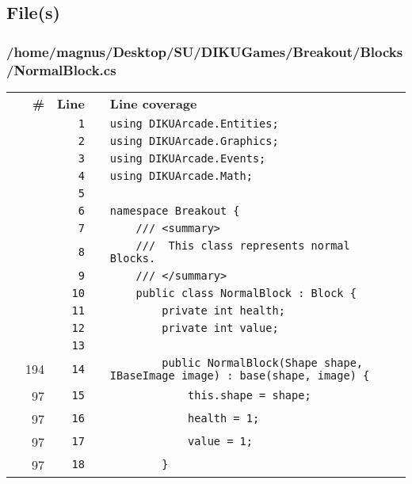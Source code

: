 \documentclass[a4paper,landscape,10pt]{article}
\begin{document}
\subsection{File(s)}
\subsubsection{/home/magnus/Desktop/SU/DIKUGames/Breakout/Blocks/NormalBlock.cs}
\begin{longtable}[l]{lrrll}
\textbf{} & \textbf{\#} & \textbf{Line} & \textbf{} & \textbf{Line coverage}\\
\cellcolor{gray} &  & \verb~1~ & & \verb~using DIKUArcade.Entities;~\\
\cellcolor{gray} &  & \verb~2~ & & \verb~using DIKUArcade.Graphics;~\\
\cellcolor{gray} &  & \verb~3~ & & \verb~using DIKUArcade.Events;~\\
\cellcolor{gray} &  & \verb~4~ & & \verb~using DIKUArcade.Math;~\\
\cellcolor{gray} &  & \verb~5~ & & \verb~~\\
\cellcolor{gray} &  & \verb~6~ & & \verb~namespace Breakout {~\\
\cellcolor{gray} &  & \verb~7~ & & \verb~    /// <summary>~\\
\cellcolor{gray} &  & \verb~8~ & & \verb~    ///  This class represents normal Blocks.~\\
\cellcolor{gray} &  & \verb~9~ & & \verb~    /// </summary>~\\
\cellcolor{gray} &  & \verb~10~ & & \verb~    public class NormalBlock : Block {~\\
\cellcolor{gray} &  & \verb~11~ & & \verb~        private int health;~\\
\cellcolor{gray} &  & \verb~12~ & & \verb~        private int value;~\\
\cellcolor{gray} &  & \verb~13~ & & \verb~~\\
\cellcolor{green} & 194 & \verb~14~ & & \verb~        public NormalBlock(Shape shape, IBaseImage image) : base(shape, image) {~\\
\cellcolor{green} & 97 & \verb~15~ & & \verb~            this.shape = shape;~\\
\cellcolor{green} & 97 & \verb~16~ & & \verb~            health = 1;~\\
\cellcolor{green} & 97 & \verb~17~ & & \verb~            value = 1;~\\
\cellcolor{green} & 97 & \verb~18~ & & \verb~        }~\\

\end{longtable}
\end{document}
